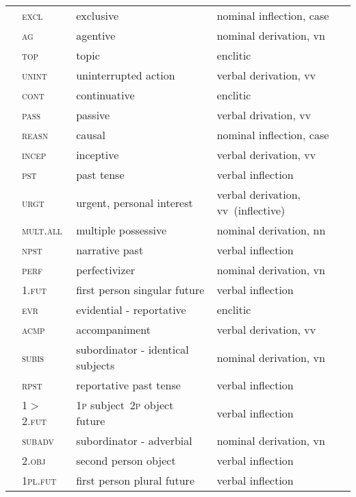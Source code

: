 \begin{refsection}
\begin{small}
\begin{longtable}{*{4}{@{\hspace{0.75ex}}l}@{\hspace{0ex}}}
 		& \textsc{excl} 		& exclusive 	& nominal inflection, case\\
		& \textsc{ag} 		& agentive 	& nominal derivation, vn\\
		& \textsc{top} 		& topic 	& enclitic\\
		& \textsc{unint} 	& uninterrupted action 	& verbal derivation, vv\\
		& \textsc{cont} 		& continuative 	& enclitic\\
		& \textsc{pass} 		& passive 	& verbal drivation, vv\\
 		& \textsc{reasn} 	& causal 	& nominal inflection, case\\
	& \textsc{incep} & inceptive 	& verbal derivation, vv\\
		& \textsc{pst} 		& past tense 	& verbal inflection\\
		& \textsc{urgt} 	& urgent, personal interest 	& verbal derivation, vv~(inflective)\\
 		& \textsc{mult.all} 	& multiple possessive 	& nominal derivation, nn\\
 	& \textsc{npst} 	& narrative past 	& verbal inflection\\
 	& \textsc{perf} 	& perfectivizer 	& nominal derivation, vn \\
 		& 1.\textsc{fut} 	& first person singular future 	& verbal inflection\\
		& \textsc{evr} 		& evidential - reportative 	& enclitic\\
		& \textsc{acmp}		& accompaniment 	& verbal derivation, vv\\
		& \textsc{subis} 	& subordinator - identical subjects 	& nominal derivation, vn\\
		& \textsc{rpst} 	& reportative past tense 	& verbal inflection\\
	& 1$>$2.\textsc{fut} 	& 1\textsc{p} subject~2\textsc{p} object future 	& verbal inflection\\
		& \textsc{subadv} 	& subordinator - adverbial 	& nominal derivation, vn\\
		& 2.\textsc{obj} 	& second person object 	& verbal inflection\\
		& 1\textsc{pl.fut} 	& first person plural future 	& verbal inflection\\

\end{longtable}
\end{small}
\end{refsection}
